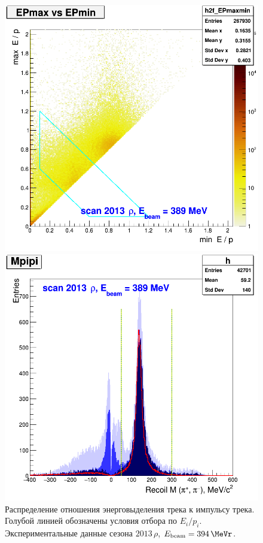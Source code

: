\begin{figure}
    \begin{minipage}[t]{0.45\textwidth}
        \includegraphics[width=\textwidth]{img/h2f_EPmaxmin_zoom.png}
        \caption{Распределение отношения энерговыделения трека к импульсу трека.
            Голубой линией обозначены условия отбора по $E_i / p_i$.
            Экспериментальные данные сезона $2013 \, \rho$, $E_{\text{beam}} = \SI{394}{\MeVr}$.}\label{fig:3pi_EPmaxmin_zoom}
    \end{minipage}
    \qquad
    \begin{minipage}[t]{0.45\textwidth}
        \includegraphics[width=\textwidth]{img/mpipi.png}

\end{minipage}
\end{figure}
